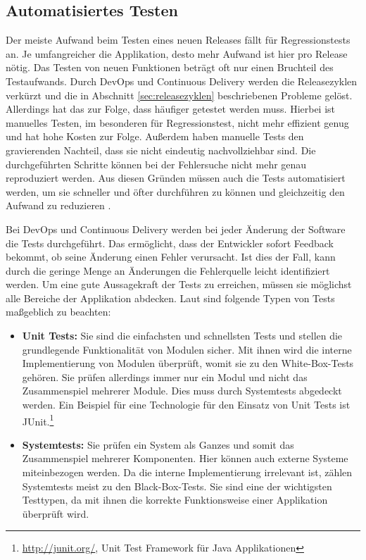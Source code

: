 \subsection{Automatisiertes Testen}
\label{sec:automation:tests}
Der meiste Aufwand beim Testen eines neuen Releases fällt für Regressionstests an. Je umfangreicher die Applikation, desto mehr Aufwand ist hier pro Release nötig. Das Testen von neuen Funktionen beträgt oft nur einen Bruchteil des Testaufwands. Durch DevOps und Continuous Delivery werden die Releasezyklen verkürzt und die in Abschnitt \ref{sec:releasezyklen} beschriebenen Probleme gelöst. Allerdings hat das zur Folge, dass häufiger getestet werden muss. Hierbei ist manuelles Testen, im besonderen für Regressionstest, nicht mehr effizient genug und hat hohe Kosten zur Folge. 
Außerdem haben manuelle Tests den gravierenden Nachteil, dass sie nicht eindeutig nachvollziehbar sind. Die durchgeführten Schritte können bei der Fehlersuche nicht mehr genau reproduziert werden. Aus diesen Gründen müssen auch die Tests automatisiert werden, um sie schneller und öfter durchführen zu können und gleichzeitig den Aufwand zu reduzieren \cite{wolff2014}.

Bei DevOps und Continuous Delivery werden bei jeder Änderung der Software die Tests durchgeführt. Das ermöglicht, dass der Entwickler sofort Feedback bekommt, ob seine Änderung einen Fehler verursacht. Ist dies der Fall, kann durch die geringe Menge an Änderungen die Fehlerquelle leicht identifiziert werden. Um eine gute Aussagekraft der Tests zu erreichen, müssen sie möglichst alle Bereiche der Applikation abdecken. Laut \cite{wolff2014} sind folgende Typen von Tests maßgeblich zu beachten:

\begin{itemize}
	\item \textbf{Unit Tests:} Sie sind die einfachsten und schnellsten Tests und stellen die grundlegende Funktionalität von Modulen sicher. Mit ihnen wird die interne Implementierung von Modulen überprüft, womit sie zu den White-Box-Tests gehören. Sie prüfen allerdings immer nur ein Modul und nicht das Zusammenspiel mehrerer Module. Dies muss durch Systemtests abgedeckt werden. Ein Beispiel für eine Technologie für den Einsatz von Unit Tests ist JUnit.\footnote{\url{http://junit.org/}, Unit Test Framework für Java Applikationen}
	\item \textbf{Systemtests:} Sie prüfen ein System als Ganzes und somit das Zusammenspiel mehrerer Komponenten. Hier können auch externe Systeme miteinbezogen werden. Da die interne Implementierung irrelevant ist, zählen Systemtests meist zu den Black-Box-Tests. Sie sind eine der wichtigsten Testtypen, da mit ihnen die korrekte Funktionsweise einer Applikation überprüft wird.
\end{itemize}

